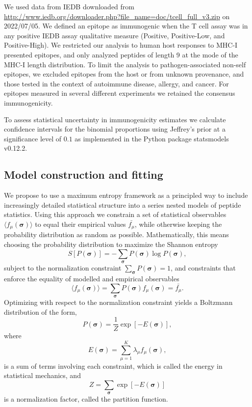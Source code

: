 \documentclass[superscriptaddress,twocolumn,pre]{revtex4}
\newcommand{\B}{\boldsymbol}
\newcommand{\<}{\langle}
\renewcommand{\>}{\rangle}
\begin{document}
We used data from IEDB \cite{Vita2019} downloaded from \url{http://www.iedb.org/downloader.php?file_name=doc/tcell_full_v3.zip} on 2022/07/05. We defined an epitope as immunogenic when the T cell assay was in any positive IEDB assay qualitative measure (Positive, Positive-Low, and Positive-High). We restricted our analysis to human host responses to MHC-I presented epitopes, and only analyzed peptides of length 9 at the mode of the MHC-I length distribution. To limit the analysis to pathogen-associated non-self epitopes, we excluded epitopes from the host or from unknown provenance, and those tested in the context of autoimmune disease, allergy, and cancer. For epitopes measured in several different experiments we retained the consensus immunogenicity.

To assess statistical uncertainty in immunogenicity estimates we calculate confidence intervals for the binomial proportions using Jeffrey's prior at a significance level of $0.1$ as implemented in the Python package statsmodels v0.12.2.

\subsection{Model construction and fitting}
We propose to use a maximum entropy framework as a principled way to include increasingly detailed statistical structure into a series nested models of peptide statistics. Using this approach we constrain a set of statistical observables $\langle f_\mu(\boldsymbol \sigma)\rangle$ to equal their empirical values $\bar{f_\mu}$, while otherwise keeping the probability distribution as random as possible. Mathematically, this means choosing the probability distribution to maximize the Shannon entropy
\begin{equation}
    S[P(\B \sigma)] = - \sum_{\B \sigma} P(\B \sigma) \log P(\B \sigma),
\end{equation}
subject to the normalization constraint $\sum_{\B \sigma} P(\B \sigma) = 1$, and constraints that enforce the equality of modelled and empirical observables
\begin{equation}
    \langle f_\mu(\boldsymbol \sigma)\rangle = \sum_{\boldsymbol \sigma} P(\boldsymbol \sigma) f_\mu(\boldsymbol \sigma) = \bar{f_\mu}.
\end{equation}
Optimizing with respect to the normalization constraint yields a Boltzmann distribution of the form,
\begin{equation}
    P(\boldsymbol \sigma) = \frac{1}{Z} \exp\left[ -E(\B \sigma) \right],
\end{equation}
where
\begin{equation}
 E(\B \sigma) = \sum_{\mu=1}^K \lambda_\mu f_\mu(\boldsymbol \sigma),
\end{equation}
is a sum of terms involving each constraint, which is called the energy in statistical mechanics, and 
\begin{equation}
    Z = \sum_{\B \sigma} \exp \left[ - E(\B \sigma) \right]
\end{equation}
is a normalization factor, called the partition function.
\end{document}
